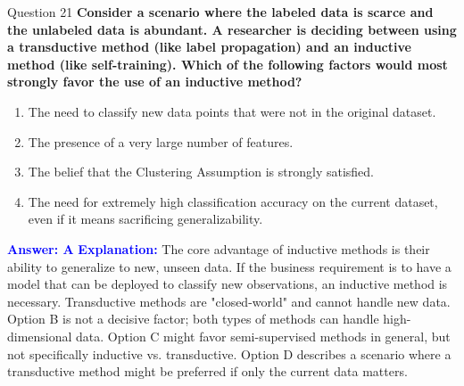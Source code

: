 \documentclass{beamer}
\begin{document}
	\begin{frame}{Question 21}
		\textbf{Consider a scenario where the labeled data is scarce and the unlabeled data is abundant. A researcher is deciding between using a transductive method (like label propagation) and an inductive method (like self-training). Which of the following factors would most strongly favor the use of an inductive method?}
		\begin{enumerate}
			\item The need to classify new data points that were not in the original dataset.
			\item The presence of a very large number of features.
			\item The belief that the Clustering Assumption is strongly satisfied.
			\item The need for extremely high classification accuracy on the current dataset, even if it means sacrificing generalizability.
		\end{enumerate}
		\vspace{0.2cm}
		\textcolor{blue}{\textbf{Answer: A}}
		\vspace{0.2cm}
		\textcolor{blue}{\textbf{Explanation:}} The core advantage of inductive methods is their ability to generalize to new, unseen data. If the business requirement is to have a model that can be deployed to classify new observations, an inductive method is necessary. Transductive methods are "closed-world" and cannot handle new data. Option B is not a decisive factor; both types of methods can handle high-dimensional data. Option C might favor semi-supervised methods in general, but not specifically inductive vs. transductive. Option D describes a scenario where a transductive method might be preferred if only the current data matters.
	\end{frame}
	
\end{document}
